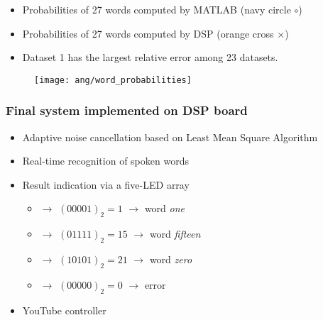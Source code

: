 
\begin{frame}
\begin{itemize}
\item Probabilities of 27 words computed by MATLAB (\textcolor{navy_matlab}{navy circle $\circ$})
\item Probabilities of 27 words computed by DSP (\textcolor{orange_matlab}{orange cross $\times$})
\item Dataset 1 has the largest relative error among 23 datasets.
\end{itemize}

\begin{figure}[H]
\centering
\texttt{[image: ang/word\_probabilities]}
\end{figure}
\end{frame}


\begin{frame}
\frametitle{Final system implemented on DSP board}
\begin{itemize}
	\item Adaptive noise cancellation based on Least Mean Square Algorithm
	\item Real-time recognition of spoken words
	\item Result indication via a five-LED array
		\begin{itemize}
		\item \LED\offLED\offLED\offLED\offLED\onLED $\longrightarrow$ $(00001)_2 = 1$ $\longrightarrow$ word \textit{one}
		\item \LED\offLED\onLED\onLED\onLED\onLED $\longrightarrow$ $(01111)_2 = 15$ $\longrightarrow$ word \textit{fifteen}
		\item \LED\onLED\offLED\onLED\offLED\onLED $\longrightarrow$ $(10101)_2 = 21$ $\longrightarrow$ word \textit{zero}
		\item \LED\offLED\offLED\offLED\offLED\offLED $\longrightarrow$ $(00000)_2 = 0$ $\longrightarrow$ error
		\end{itemize}
	\item YouTube controller
\end{itemize}
\end{frame}

